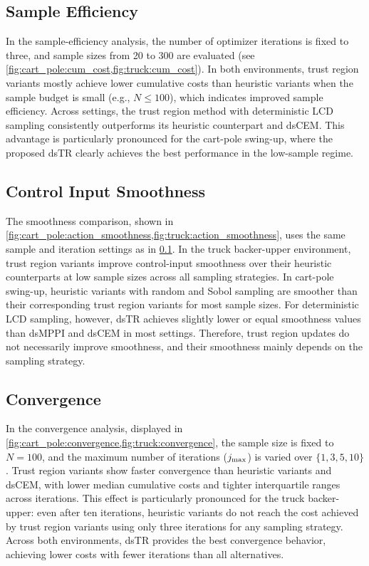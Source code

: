 \subsection{Sample Efficiency}
\label{sec:eval:sample_efficiency}

In the sample-efficiency analysis, the number of optimizer iterations is fixed to three, and sample sizes from \num{20} to \num{300} are evaluated (see \cref{fig:cart_pole:cum_cost,fig:truck:cum_cost}).
%
In both environments, trust region variants mostly achieve lower cumulative costs than heuristic variants when the sample budget is small (e.g., $N \le 100$),  which indicates improved sample efficiency.
%
Across settings, the trust region method with deterministic \ac{LCD} sampling consistently outperforms its heuristic counterpart and dsCEM.
This advantage is particularly pronounced for the cart-pole swing-up, where the proposed dsTR clearly achieves the best performance in the low-sample regime.

\subsection{Control Input Smoothness}
\label{sec:eval:smoothness}
The smoothness comparison, shown in \cref{fig:cart_pole:action_smoothness,fig:truck:action_smoothness}, uses the same sample and iteration settings as in \cref{sec:eval:sample_efficiency}.
%
In the truck backer-upper environment, trust region variants improve control-input smoothness over their heuristic counterparts at low sample sizes across all sampling strategies.
%
In cart-pole swing-up, heuristic variants with random and Sobol sampling are smoother than their corresponding trust region variants for most sample sizes.
For deterministic \ac{LCD} sampling, however, dsTR achieves slightly lower or equal smoothness values than dsMPPI and dsCEM in most settings.
%
Therefore, trust region updates do not necessarily improve smoothness, and their smoothness mainly depends on the sampling strategy.

\subsection{Convergence}

In the convergence analysis, displayed in \cref{fig:cart_pole:convergence,fig:truck:convergence}, the sample size is fixed to $N=100$, and the maximum number of iterations ($j_\mathrm{max}$) is varied over $\{1,3,5,10\}$.
%
Trust region variants show faster convergence than heuristic variants and dsCEM, with lower median cumulative costs and tighter interquartile ranges across iterations.
This effect is particularly pronounced for the truck backer-upper: even after ten iterations, heuristic variants do not reach the cost achieved by trust region variants using only three iterations for any sampling strategy.
%
Across both environments, dsTR provides the best convergence behavior, achieving lower costs with fewer iterations than all alternatives.

